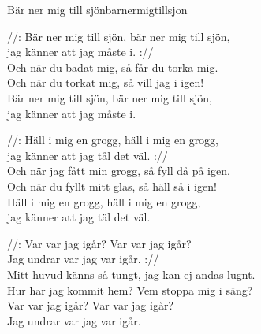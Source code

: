 \begin{song}{Bär ner mig till sjön}{barnermigtillsjon}
\begin{vers}
//: Bär ner mig till sjön, bär ner mig till sjön, \\
jag känner att jag måste i. ://\\
Och när du badat mig, så får du torka mig.\\
Och när du torkat mig, så vill jag i igen!\\
Bär ner mig till sjön, bär ner mig till sjön,\\
jag känner att jag måste i.\\
\end{vers}
\begin{vers}
//: Häll i mig en grogg, häll i mig en grogg, \\
jag känner att jag tål det väl. ://\\
Och när jag fått min grogg, så fyll då på igen.\\
Och när du fyllt mitt glas, så häll så i igen!\\
Häll i mig en grogg, häll i mig en grogg,\\
jag känner att jag täl det väl.\\
\end{vers}
\begin{vers}
//: Var var jag igår? Var var jag igår? \\
Jag undrar var jag var igår. ://\\
Mitt huvud känns så tungt, jag kan ej andas lugnt.\\
Hur har jag kommit hem? Vem stoppa mig i säng?\\
Var var jag igår? Var var jag igår?\\
Jag undrar var jag var igår.\\
\end{vers}
\end{song}
